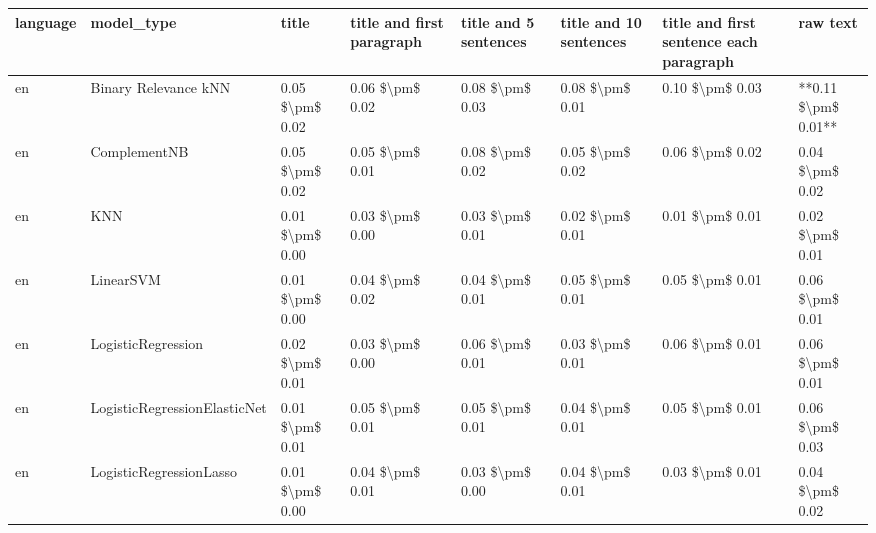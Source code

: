 \begin{tabular}{llllllll}
\toprule
language &                      model\_type &           title & title and first paragraph & title and 5 sentences & title and 10 sentences & title and first sentence each paragraph &            raw text \\
\midrule
      en &            Binary Relevance kNN & 0.05 \$\textbackslash pm\$ 0.02 &           0.06 \$\textbackslash pm\$ 0.02 &       0.08 \$\textbackslash pm\$ 0.03 &        0.08 \$\textbackslash pm\$ 0.01 &                         0.10 \$\textbackslash pm\$ 0.03 & **0.11 \$\textbackslash pm\$ 0.01** \\
      en &                    ComplementNB & 0.05 \$\textbackslash pm\$ 0.02 &           0.05 \$\textbackslash pm\$ 0.01 &       0.08 \$\textbackslash pm\$ 0.02 &        0.05 \$\textbackslash pm\$ 0.02 &                         0.06 \$\textbackslash pm\$ 0.02 &     0.04 \$\textbackslash pm\$ 0.02 \\
      en &                             KNN & 0.01 \$\textbackslash pm\$ 0.00 &           0.03 \$\textbackslash pm\$ 0.00 &       0.03 \$\textbackslash pm\$ 0.01 &        0.02 \$\textbackslash pm\$ 0.01 &                         0.01 \$\textbackslash pm\$ 0.01 &     0.02 \$\textbackslash pm\$ 0.01 \\
      en &                       LinearSVM & 0.01 \$\textbackslash pm\$ 0.00 &           0.04 \$\textbackslash pm\$ 0.02 &       0.04 \$\textbackslash pm\$ 0.01 &        0.05 \$\textbackslash pm\$ 0.01 &                         0.05 \$\textbackslash pm\$ 0.01 &     0.06 \$\textbackslash pm\$ 0.01 \\
      en &              LogisticRegression & 0.02 \$\textbackslash pm\$ 0.01 &           0.03 \$\textbackslash pm\$ 0.00 &       0.06 \$\textbackslash pm\$ 0.01 &        0.03 \$\textbackslash pm\$ 0.01 &                         0.06 \$\textbackslash pm\$ 0.01 &     0.06 \$\textbackslash pm\$ 0.01 \\
      en &    LogisticRegressionElasticNet & 0.01 \$\textbackslash pm\$ 0.01 &           0.05 \$\textbackslash pm\$ 0.01 &       0.05 \$\textbackslash pm\$ 0.01 &        0.04 \$\textbackslash pm\$ 0.01 &                         0.05 \$\textbackslash pm\$ 0.01 &     0.06 \$\textbackslash pm\$ 0.03 \\
      en &         LogisticRegressionLasso & 0.01 \$\textbackslash pm\$ 0.00 &           0.04 \$\textbackslash pm\$ 0.01 &       0.03 \$\textbackslash pm\$ 0.00 &        0.04 \$\textbackslash pm\$ 0.01 &                         0.03 \$\textbackslash pm\$ 0.01 &     0.04 \$\textbackslash pm\$ 0.02 \\

\end{tabular}
